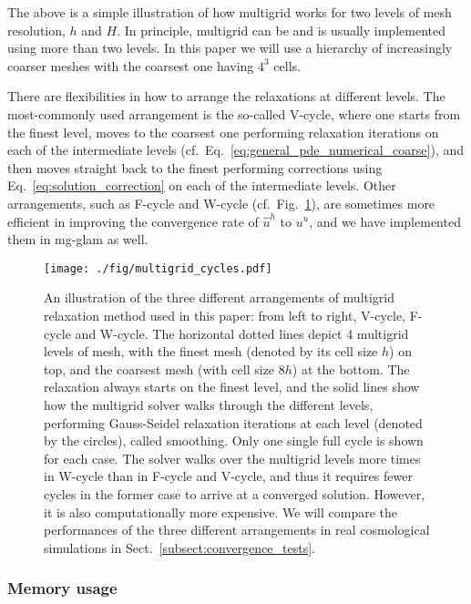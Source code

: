 The above is a simple illustration of how multigrid works for two levels of mesh resolution, $h$ and $H$. In principle, multigrid can be and is usually implemented using more than two levels. In this paper we will use a hierarchy of increasingly coarser meshes with the coarsest one having $4^3$ cells. 

There are flexibilities in how to arrange the relaxations at different levels. The most-commonly used arrangement is the so-called V-cycle, where one starts from the finest level, moves to the coarsest one performing relaxation iterations on each of the intermediate levels (cf.~Eq.~\eqref{eq:general_pde_numerical_coarse}), and then moves straight back to the finest performing corrections using Eq.~\eqref{eq:solution_correction} on each of the intermediate levels. Other arrangements, such as F-cycle and W-cycle (cf.~Fig.~\ref{fig:multigrid_cycles}), are sometimes more efficient in improving the convergence rate of $\hat{u}^h$ to $u^u$, and we have implemented them in {\sc mg}-{\sc glam} as well. 

\begin{figure}
    \centering
    \texttt{[image: ./fig/multigrid\_cycles.pdf]}
\caption{An illustration of the three different arrangements of multigrid relaxation method used in this paper: from left to right, V-cycle, F-cycle and W-cycle. The horizontal dotted lines depict 4 multigrid levels of mesh, with the finest mesh (denoted by its cell size $h$) on top, and the coarsest mesh (with cell size $8h$) at the bottom. The relaxation always starts on the finest level, and the solid lines show how the multigrid solver walks through the different levels, performing Gauss-Seidel relaxation iterations at each level (denoted by the circles), called smoothing. Only one single full cycle is shown for each case. The solver walks over the multigrid levels more times in W-cycle than in F-cycle and V-cycle, and thus it requires fewer cycles in the former case to arrive at a converged solution. However, it is also computationally more expensive. We will compare the performances of the three different arrangements in real cosmological simulations in Sect.~\ref{subsect:convergence_tests}.}
    \label{fig:multigrid_cycles}
\end{figure}

\subsubsection{Memory usage}
\label{subsubsect:code_struc}

